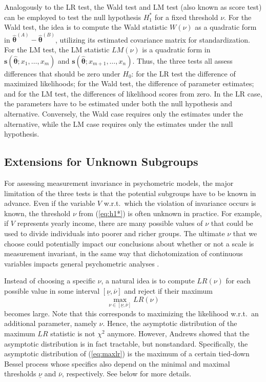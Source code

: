 \documentclass[man]{apa}
\begin{document}
Analogously to the LR test, the Wald test and LM test (also known as score test)
can be employed to test the null hypothesis $H_1^*$ for a fixed threshold $\nu$.
For the Wald test, the idea is to compute the Wald statistic $W(\nu)$ as a quadratic
form in $\hat {\bm \theta}^{(A)} - \hat {\bm \theta}^{(B)}$, utilizing its estimated
covariance matrix for standardization. For the LM test, the LM statistic
$\mathit{LM}(\nu)$ is a quadratic form in ${\bm s}(\hat {\bm \theta}; x_1, \dots, x_m)$
and ${\bm s}(\hat {\bm \theta}; x_{m+1}, \dots, x_n)$. Thus, the three tests all assess
differences that should be zero under $H_0$: for the LR test the difference of maximized
likelihoods; for the Wald test, the difference of parameter estimates; and for the
LM test, the differences of likelihood scores from zero. In the LR case, the parameters
have to be estimated under both the null hypothesis and alternative.
Conversely, the Wald case requires  
only the estimates under the alternative, while the LM case requires
only the estimates under the null hypothesis.


\subsection{Extensions for Unknown Subgroups}

For assessing measurement invariance in psychometric models, the major limitation of
the three tests is that the potential subgroups have to be known in advance. 
Even if the variable $V$ w.r.t.\ which the violation of invariance occurs is
known, the threshold $\nu$ from (\ref{eq:h1*}) is often unknown in practice.
For example, if $V$ represents yearly income, there are many possible
values of $\nu$ that could be used to divide individuals into poorer and richer
groups.  The ultimate $\nu$ that we
choose could potentially impact our
conclusions about whether or not a scale is measurement invariant, 
in the same way that dichotomization of continuous variables impacts
general psychometric analyses \cite{MacZha02}.

Instead of choosing a specific $\nu$, a natural idea is to compute $\mathit{LR}(\nu)$
for each possible value in some interval $[\underline{\nu}, \overline{\nu}]$ and
reject if their maximum
\begin{equation} \label{eq:maxlr}
  \max_{\nu \in [\underline{\nu}, \overline{\nu}]} \mathit{LR}(\nu)
\end{equation}
becomes large. Note that this corresponds to maximizing the likelihood w.r.t.\
an additional parameter, namely $\nu$. Hence, the asymptotic distribution of the
maximum $\mathit{LR}$ statistic is not $\chi^2$ anymore. However, Andrews \citeyear{And93}
showed that the asymptotic distribution is in fact tractable, but nonstandard.
Specifically, the asymptotic distribution of (\ref{eq:maxlr}) is the maximum of a
certain tied-down Bessel process whose specifics also depend on the minimal
and maximal thresholds $\underline{\nu}$ and $\overline{\nu}$, respectively.
See below for more details.
\end{document}
